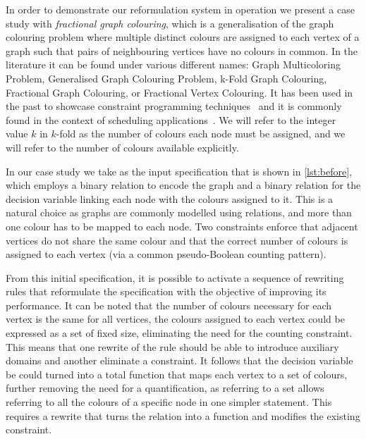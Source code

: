 \documentclass[anonymous,a4paper,UKenglish,cleveref,pdfa]{lipics-v2021}
\begin{document}
In order to demonstrate our reformulation system in operation we present a case study with {\em fractional graph colouring}, which is a generalisation of the graph colouring problem where multiple distinct colours are assigned to each vertex of a graph such that pairs of neighbouring vertices have no colours in common. In the literature it can be found under various different names: Graph Multicoloring Problem, Generalised Graph Colouring Problem, k-Fold Graph Colouring, Fractional Graph Colouring, or Fractional Vertex Colouring. It has been used in the past to showcase constraint programming techniques~\cite{gualandi2012exact,prestwich2008generalised} and it is commonly found in the context of scheduling applications~\cite{jansen2004preemptive}. We will refer to the integer value $k$ in $k$-fold as the number of colours each node must be assigned, and we will refer to the number of colours available explicitly.

In our case study we take as the input specification that is shown in \cref{lst:before}, which employs a binary relation to encode the graph and a binary relation for the decision variable linking each node with the colours assigned to it. This is a natural choice as graphs are commonly modelled using relations, and more than one colour has to be mapped to each node. Two constraints enforce that adjacent vertices do not share the same colour and that the correct number of colours is assigned to each vertex (via a common pseudo-Boolean counting pattern).

From this initial specification, it is possible to activate a sequence of rewriting rules that reformulate the specification with the objective of improving its performance. It can be noted that the number of colours necessary for each vertex is the same for all vertices, the colours assigned to each vertex could be expressed as a set of fixed size, eliminating the need for the counting constraint. This means that one rewrite of the rule should be able to introduce auxiliary domains and another eliminate a constraint.
It follows that the decision variable be could turned into a total function that maps each vertex to a set of colours, further removing the need for a quantification, as referring to a set allows referring to all the colours of a specific node in one simpler statement. This requires a rewrite that turns the relation into a function and modifies the existing constraint.
\end{document}

